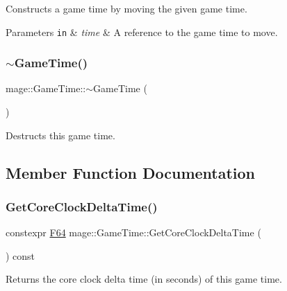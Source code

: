 Constructs a game time by moving the given game time.


\begin{DoxyParams}[1]{Parameters}
\mbox{\tt in}  & {\em time} & A reference to the game time to move. \\
\hline
\end{DoxyParams}
\mbox{\label{classmage_1_1_game_time_ae7a709bde27a737be9ebed2a92e00c8b}} 
\subsubsection{\texorpdfstring{$\sim$\+Game\+Time()}{~GameTime()}}
{\footnotesize\ttfamily mage\+::\+Game\+Time\+::$\sim$\+Game\+Time (\begin{DoxyParamCaption}{ }\end{DoxyParamCaption})\hspace{0.3cm}{\ttfamily [default]}}

Destructs this game time. 

\subsection{Member Function Documentation}
\mbox{\label{classmage_1_1_game_time_a19333f5e42d9b968e0a172592f7d0bb8}} 
\subsubsection{\texorpdfstring{Get\+Core\+Clock\+Delta\+Time()}{GetCoreClockDeltaTime()}}
{\footnotesize\ttfamily constexpr \mbox{\hyperlink{namespacemage_ad26233bbec640deda836e572c1a23708}{F64}} mage\+::\+Game\+Time\+::\+Get\+Core\+Clock\+Delta\+Time (\begin{DoxyParamCaption}{ }\end{DoxyParamCaption}) const\hspace{0.3cm}{\ttfamily [noexcept]}}

Returns the core clock delta time (in seconds) of this game time.

